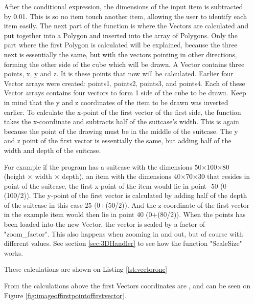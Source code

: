 After the conditional expression, the dimensions of the input item is subtracted by 0.01. This is so no item touch another item, allowing the user to identify each item easily. 
The next part of the function is where the Vectors are calculated and put together into a Polygon and inserted into the array of Polygons. Only the part where the first Polygon is calculated will be explained, because the three next is essentially the same, but with the vectors pointing in other directions, forming the other side of the cube which will be drawn.
A Vector contains three points, x, y and z. It is these points that now will be calculated. Earlier four Vector arrays were created: points1, points2, points3, and points4. Each of these Vector arrays contains four vectors to form 1 side of the cube to be drawn. 
Keep in mind that the y and z coordinates of the item to be drawn was inverted earlier. 
To calculate the x-point of the first vector of the first side, the function takes the x-coordinate and subtracts half of the suitcase's width. This is again because the  point of the drawing must be in the middle of the suitcase. The y and z point of the first vector is essentially the same, but adding half of the width and depth of the suitcase.

For example if the program has a suitcase with the dimensions 50×100×80 (height × width × depth), an item with the dimensions 40×70×30 that resides in point  of the suitcase, the first x-point of the item would lie in point -50 (0-(100/2)). 
The y-point of the first vector is calculated by adding half of the depth of the suitcase in this case 25 (0+(50/2)). And the z-coordinate of the first vector in the example item would then lie in point 40 (0+(80/2)).
When the points has been loaded into the new Vector, the vector is scaled by a factor of "zoom\_factor". This also happens when zooming in and out, but of course with different values. See section \ref{sec:3DHandler} to see how the function "ScaleSize" works. 

These calculations are shown on Listing \ref{lst:vectorone}


From the calculations above the first Vectors coordinates are , and can be seen on Figure  \ref{fig:imageoffirstpointoffirstvector}.

